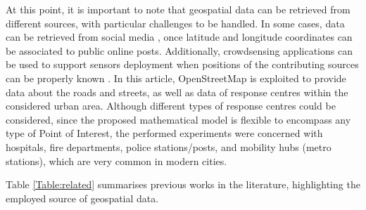 \begin{refsection}
At this point, it is important to note that geospatial data can be retrieved from different sources, with particular challenges to be handled. In some cases, data can be retrieved from social media \cite{twitterGeospatialSensors}, once latitude and longitude coordinates can be associated to public online posts. Additionally, crowdsensing applications can be used to support sensors deployment when positions of the contributing sources can be properly known \cite{positioning5}. In this article, OpenStreetMap is exploited to provide data about the roads and streets, as well as data of response centres within the considered urban area. Although different types of response centres could be considered, since the proposed mathematical model is flexible to encompass any type of Point of Interest, the performed experiments were concerned with hospitals, fire departments, police stations/posts, and mobility hubs (metro stations), which are very common in modern cities. 

Table \ref{Table:related} summarises previous works in the literature, highlighting the employed source of geospatial data. 

\begin{table}
  \centering
  \caption{Some works exploiting geospatial data to support sensors positioning and deployment.}
  \label{Table:related}
\end{table}


\end{refsection}
